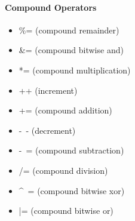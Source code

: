 \documentclass[../informe_krapp.tex]{subfiles}
\begin{document}
\begin{multicols}{2}
	\paragraph{Compound Operators}
	\begin{itemize}
		\item \%= (compound remainder)
		\item \&= (compound bitwise and)
		\item *= (compound multiplication)
		\item ++ (increment)
		\item += (compound addition)
		\item -~- (decrement)
		\item -~= (compound subtraction)
		\item /= (compound division)
		\item \^~= (compound bitwise xor)
		\item |= (compound bitwise or)
	\end{itemize}

\end{multicols}
\end{document}
